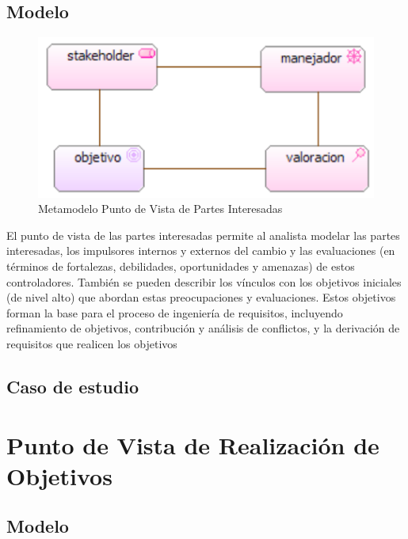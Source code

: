 \subsection{Modelo}
\begin{figure}[th!]
	\centering
	\includegraphics[width=0.7\linewidth]{arquitectura/imagenes/modeloStakeholder}
	\caption{Metamodelo Punto de Vista de Partes Interesadas}
	\label{metamodelo partes interesadas}
\end{figure}
El punto de vista de las partes interesadas permite al analista modelar las partes interesadas, los impulsores internos y externos del cambio y las evaluaciones (en términos de fortalezas, debilidades, oportunidades y amenazas) de estos controladores. También se pueden describir los vínculos con los objetivos iniciales (de nivel alto) que abordan estas preocupaciones y evaluaciones. Estos objetivos forman la base para el proceso de ingeniería de requisitos, incluyendo refinamiento de objetivos, contribución y análisis de conflictos, y la derivación de requisitos que realicen los objetivos


\subsection{Caso  de estudio}

\newpage

\section{Punto de Vista de Realización de Objetivos}

\subsection{Modelo}

